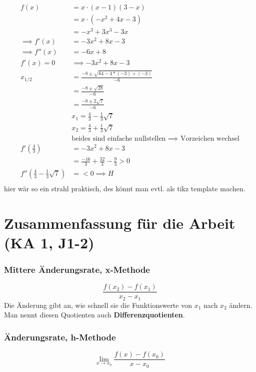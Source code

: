 \documentclass{report}
\begin{document}
\begin{align*}
f(x)&=x\cdot (x-1)(3-x)\\
&=x\cdot(-x^2+4x-3)\\
&=-x^3+3x^3-3x\\
\implies f'(x)&=-3x^2+8x-3\\
\implies f''(x)&=-6x+8\\
f'(x)=0&\implies -3x^2+8x-3\\
x_{1/2}&=\frac{-8 \pm \sqrt{64-4*(-3)+(-3)}}{-6}\\
       &=\frac{-8\pm \sqrt{28}}{-6}\\
       &=\frac{-8\pm 2\sqrt{7}}{-6}\\
       &x_1= \frac{4}{3}-\frac{1}{3}\sqrt{7}\\
       &x_2=\frac{4}{3}+ \frac{1}{3}\sqrt{7}\\
       &\text{beides sind einfache nullstellen $\implies$ Vorzeichen wechsel}\\
f'(\frac{4}{3})&=-3x^2+8x-3\\
               &=\frac{-16}{3}+\frac{32}{3}-\frac{9}{3}>0\\
f''(\frac{4}{3}-\frac{1}{3}\sqrt{7})&=<0 \implies H\\
\end{align*}
hier wär so ein strahl praktisch, des könnt man evtl. als tikz template machen.


\section{Zusammenfassung für die Arbeit (KA 1, J1-2)}
\subsubsection{Mittere Änderungsrate, x-Methode}
\[\frac{f(x_2)-f(x_1)}{x_2-x_1}\]
Die Änderung gibt an, wie schnell sie die Funktionswerte von $x_1$ nach $x_2$
ändern. Man nennt diesen Quotienten auch \textbf{Differenzquotienten}.

\subsubsection{Änderungsrate, h-Methode}
\[\lim_{x \to x_0}\frac{f(x)-f(x_0)}{x-x_0}\]

\end{document}
